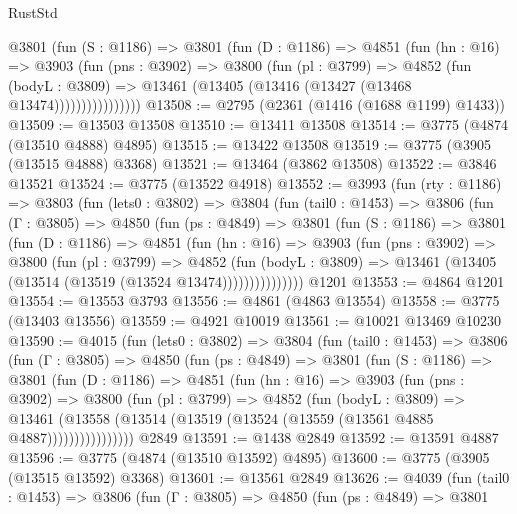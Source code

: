 \begin{lexlean}{RustStd}
\begin{coremodule}
{\begin{coremodule}
{{{{{{{{{{{{{{{{{{{{{{{{{{{{{{{              @3801
                (fun (S : @1186) =>
                @3801
                  (fun (D : @1186) =>
                  @4851
                    (fun (hn : @16) =>
                    @3903
                      (fun (pns : @3902) =>
                      @3800
                        (fun (pl : @3799) =>
                        @4852
                          (fun (bodyL : @3809) =>
                          @13461 (@13405 (@13416 (@13427 (@13468 @13474))))))))))))))))
@13508 := @2795 (@2361 (@1416 (@1688 @1199) @1433))
@13509 := @13503 @13508
@13510 := @13411 @13508
@13514 := @3775 (@4874 (@13510 @4888) @4895)
@13515 := @13422 @13508
@13519 := @3775 (@3905 (@13515 @4888) @3368)
@13521 := @13464 (@3862 @13508)
@13522 := @3846 @13521
@13524 := @3775 (@13522 @4918)
@13552 := @3993
    (fun (rty : @1186) =>
    @3803
      (fun (lets0 : @3802) =>
      @3804
        (fun (tail0 : @1453) =>
        @3806
          (fun (Γ : @3805) =>
          @4850
            (fun (ps : @4849) =>
            @3801
              (fun (S : @1186) =>
              @3801
                (fun (D : @1186) =>
                @4851
                  (fun (hn : @16) =>
                  @3903
                    (fun (pns : @3902) =>
                    @3800
                      (fun (pl : @3799) =>
                      @4852
                        (fun (bodyL : @3809) =>
                        @13461 (@13405 (@13514 (@13519 (@13524 @13474)))))))))))))))
    @1201
@13553 := @4864 @1201
@13554 := @13553 @3793
@13556 := @4861 (@4863 @13554)
@13558 := @3775 (@13403 @13556)
@13559 := @4921 @10019
@13561 := @10021 @13469 @10230
@13590 := @4015
    (fun (lets0 : @3802) =>
    @3804
      (fun (tail0 : @1453) =>
      @3806
        (fun (Γ : @3805) =>
        @4850
          (fun (ps : @4849) =>
          @3801
            (fun (S : @1186) =>
            @3801
              (fun (D : @1186) =>
              @4851
                (fun (hn : @16) =>
                @3903
                  (fun (pns : @3902) =>
                  @3800
                    (fun (pl : @3799) =>
                    @4852
                      (fun (bodyL : @3809) =>
                      @13461
                        (@13558 (@13514 (@13519 (@13524 (@13559 (@13561 @4885 @4887))))))))))))))))
    @2849
@13591 := @1438 @2849
@13592 := @13591 @4887
@13596 := @3775 (@4874 (@13510 @13592) @4895)
@13600 := @3775 (@3905 (@13515 @13592) @3368)
@13601 := @13561 @2849
@13626 := @4039
    (fun (tail0 : @1453) =>
    @3806
      (fun (Γ : @3805) =>
      @4850
        (fun (ps : @4849) =>
        @3801
}}}}}}}}}}}}}}}}}}}}}}}}}}}}}}}
\end{coremodule}}
\end{coremodule}
\end{lexlean}
